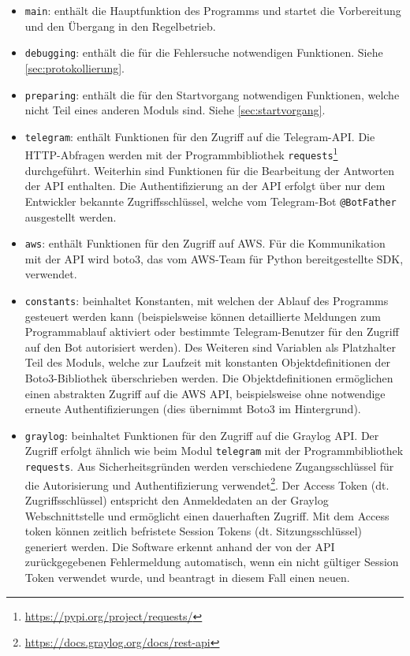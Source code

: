 \begin{itemize}
\item \lstinline{main}: enthält die Hauptfunktion des Programms und startet die Vorbereitung und den Übergang in den Regelbetrieb.
\item \lstinline{debugging}: enthält die für die Fehlersuche notwendigen Funktionen. Siehe \autoref{sec:protokollierung}.
\item \lstinline{preparing}: enthält die für den Startvorgang notwendigen Funktionen, welche nicht Teil eines anderen Moduls sind. Siehe \autoref{sec:startvorgang}.
\item \lstinline{telegram}: enthält Funktionen für den Zugriff auf die Telegram-API. Die HTTP-Abfragen werden mit der Programmbibliothek \lstinline{requests}\footnote{\url{https://pypi.org/project/requests/}} durchgeführt. Weiterhin sind Funktionen für die Bearbeitung der Antworten der API enthalten. Die Authentifizierung an der API erfolgt über nur dem Entwickler bekannte Zugriffsschlüssel, welche vom Telegram-Bot \lstinline{@BotFather} ausgestellt werden.
\item \lstinline{aws}: enthält Funktionen für den Zugriff auf AWS. Für die Kommunikation mit der API wird boto3, das vom AWS-Team für Python bereitgestellte SDK, verwendet.
\item \lstinline{constants}: beinhaltet Konstanten, mit welchen der Ablauf des Programms gesteuert werden kann (beispielsweise können detaillierte Meldungen zum Programmablauf aktiviert oder bestimmte Telegram-Benutzer für den Zugriff auf den Bot autorisiert werden). Des Weiteren sind Variablen als Platzhalter Teil des Moduls, welche zur Laufzeit mit konstanten Objektdefinitionen der Boto3-Bibliothek überschrieben werden. Die Objektdefinitionen ermöglichen einen abstrakten Zugriff auf die AWS API, beispielsweise ohne notwendige erneute Authentifizierungen (dies übernimmt Boto3 im Hintergrund).
\item \lstinline{graylog}: beinhaltet Funktionen für den Zugriff auf die Graylog API. Der Zugriff erfolgt ähnlich wie beim Modul \lstinline{telegram} mit der Programmbibliothek \lstinline{requests}. Aus Sicherheitsgründen werden verschiedene Zugangsschlüssel für die Autorisierung und Authentifizierung verwendet\footnote{\url{https://docs.graylog.org/docs/rest-api}}. Der Access Token (dt. Zugriffsschlüssel) entspricht den Anmeldedaten an der Graylog Webschnittstelle und ermöglicht einen dauerhaften Zugriff. Mit dem Access token können zeitlich befristete Session Tokens (dt. Sitzungsschlüssel) generiert werden. Die Software erkennt anhand der von der API zurückgegebenen Fehlermeldung automatisch, wenn ein nicht gültiger Session Token verwendet wurde, und beantragt in diesem Fall einen neuen.

\end{itemize}
